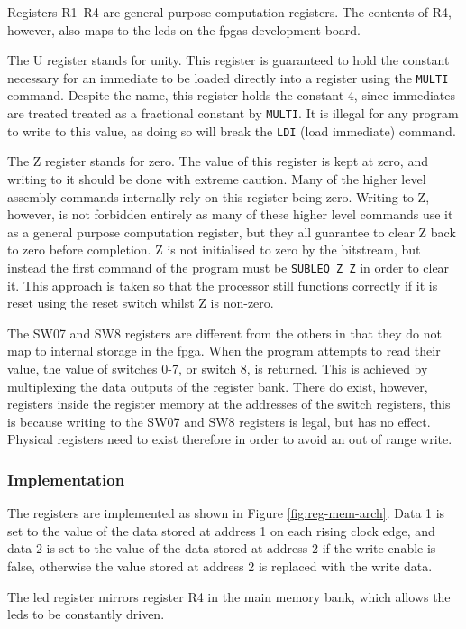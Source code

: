 Registers R1--R4 are general purpose computation registers. The contents of R4, however, also maps to the \glspl{led} on the \glspl{fpga} development board.

The U register stands for unity. This register is guaranteed to hold the constant necessary for an immediate to be loaded directly into a register using the \texttt{MULTI} command. Despite the name, this register holds the constant $4$, since immediates are treated treated as a fractional constant by \texttt{MULTI}. It is illegal for any program to write to this value, as doing so will break the \texttt{LDI} (load immediate) command.

The Z register stands for zero. The value of this register is kept at zero, and writing to it should be done with extreme caution. Many of the higher level assembly commands internally rely on this register being zero. Writing to Z, however, is not forbidden entirely as many of these higher level commands use it as a general purpose computation register, but they all guarantee to clear Z back to zero before completion. Z is not initialised to zero by the bitstream, but instead the first command of the program must be \texttt{SUBLEQ Z Z} in order to clear it. This approach is taken so that the processor still functions correctly if it is reset using the reset switch whilst Z is non-zero.

The SW07 and SW8 registers are different from the others in that they do not map to internal storage in the \gls{fpga}. When the program attempts to read their value, the value of switches 0-7, or switch 8, is returned. This is achieved by multiplexing the data outputs of the register bank. There do exist, however, registers inside the register memory at the addresses of the switch registers, this is because writing to the SW07 and SW8 registers is legal, but has no effect. Physical registers need to exist therefore in order to avoid an out of range write.

\subsubsection{Implementation}
The registers are implemented as shown in Figure \ref{fig:reg-mem-arch}. Data 1 is set to the value of the data stored at address 1 on each rising clock edge, and data 2 is set to the value of the data stored at address 2 if the write enable is false, otherwise the value stored at address 2 is replaced with the write data.

The \gls{led} register mirrors register R4 in the main memory bank, which allows the \glspl{led} to be constantly driven.

